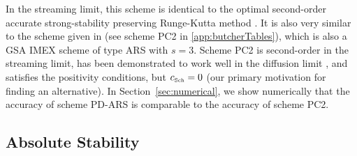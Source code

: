 In the streaming limit, this scheme is identical to the optimal second-order accurate strong-stability preserving Runge-Kutta method \cite{gottlieb_etal_2001}.  
It is also very similar to the scheme given in \cite{mcclarren_etal_2008} (see scheme PC2 in \ref{app:butcherTables}), which is also a GSA IMEX scheme of type ARS with $s=3$.  
Scheme PC2 is second-order in the streaming limit, has been demonstrated to work well in the diffusion limit \cite{mcclarren_etal_2008,radice_etal_2013}, and satisfies the positivity conditions, but $c_{\mbox{\tiny Sch}}=0$ (our primary motivation for finding an alternative).  
In Section~\ref{sec:numerical}, we show numerically that the accuracy of scheme PD-ARS is comparable to the accuracy of scheme PC2.  

\subsection{Absolute Stability}

